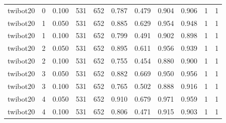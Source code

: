 \begin{tabular}{lrrrrrrrrrr}
twibot20 & 0 & 0.100 & 531 & 652 & 0.787 & 0.479 & 0.904 & 0.906 & 1 & 1 \\
twibot20 & 1 & 0.050 & 531 & 652 & 0.885 & 0.629 & 0.954 & 0.948 & 1 & 1 \\
twibot20 & 1 & 0.100 & 531 & 652 & 0.799 & 0.491 & 0.902 & 0.898 & 1 & 1 \\
twibot20 & 2 & 0.050 & 531 & 652 & 0.895 & 0.611 & 0.956 & 0.939 & 1 & 1 \\
twibot20 & 2 & 0.100 & 531 & 652 & 0.755 & 0.454 & 0.880 & 0.900 & 1 & 1 \\
twibot20 & 3 & 0.050 & 531 & 652 & 0.882 & 0.669 & 0.950 & 0.956 & 1 & 1 \\
twibot20 & 3 & 0.100 & 531 & 652 & 0.765 & 0.502 & 0.888 & 0.916 & 1 & 1 \\
twibot20 & 4 & 0.050 & 531 & 652 & 0.910 & 0.679 & 0.971 & 0.959 & 1 & 1 \\
twibot20 & 4 & 0.100 & 531 & 652 & 0.806 & 0.471 & 0.915 & 0.903 & 1 & 1 \\
\bottomrule
\end{tabular}
